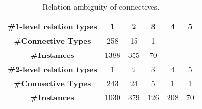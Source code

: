 \begin{table}[h]
\centering
\begin{tabular}{|c|c|c|c|c|c|}
\hline
\bf \#1-level relation types & 1    & 2   & 3   & 4   & 5  \\ \hline
\bf \#Connective Types       & 258  & 15  & 1   & -   & -  \\ \hline
\bf \#Instances              & 1388 & 355 & 70  & -   & -  \\ \hline

\hhline{|=|=|=|=|=|=|}

\bf \#2-level relation types & 1    & 2   & 3   & 4   & 5  \\ \hline
\bf \#Connective Types       & 243  & 24  & 5   & 1   & 1  \\ \hline
\bf \#Instances              & 1030 & 379 & 126 & 208 & 70 \\ \hline

\end{tabular}
\caption{\label{t:connective-type} Relation ambiguity of connectives. }
\end{table}
